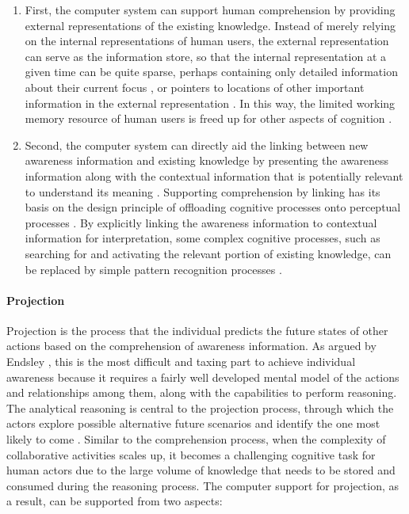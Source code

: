 \begin{enumerate}
   \item First, the computer system can support human comprehension by providing external representations of the existing knowledge. Instead of merely relying on the internal representations of human users, the external representation can serve as the information store, so that the internal representation at a given time can be quite sparse, perhaps containing only detailed information about their current focus \cite{Hegarty2011}, or pointers to locations of other important information in the external representation \cite{M.1996}. In this way, the limited working memory resource of human users is freed up for other aspects of cognition \cite{M.1996}.
   \item Second, the computer system can directly aid the linking between new awareness information and existing knowledge by presenting the awareness information along with the contextual information that is potentially relevant to understand its meaning \cite{Tomaszewski2010}. Supporting comprehension by linking has its basis on the design principle of offloading cognitive processes onto perceptual processes \cite{M.1996}. By explicitly linking the awareness information to contextual information for interpretation, some complex cognitive processes, such as searching for and activating the relevant portion of existing knowledge, can be replaced by simple pattern recognition processes \cite{Hegarty2011}. 
\end{enumerate}

\paragraph*{Projection} %
\label{par:projection}
Projection is the process that the individual predicts the future states of other actions based on the comprehension of awareness information. As argued by Endsley \cite{Endsley1995}, this is the most difficult and taxing part to achieve individual awareness because it requires a fairly well developed mental model of the actions and relationships among them, along with the capabilities to perform reasoning. The analytical reasoning is central to the projection process, through which the actors explore possible alternative future scenarios and identify the one most likely to come \cite{Thomas2006}. Similar to the comprehension process, when the complexity of collaborative activities scales up, it becomes a challenging cognitive task for human actors due to the large volume of knowledge that needs to be stored and consumed during the reasoning process. The computer support for projection, as a result, can be supported from two aspects:

